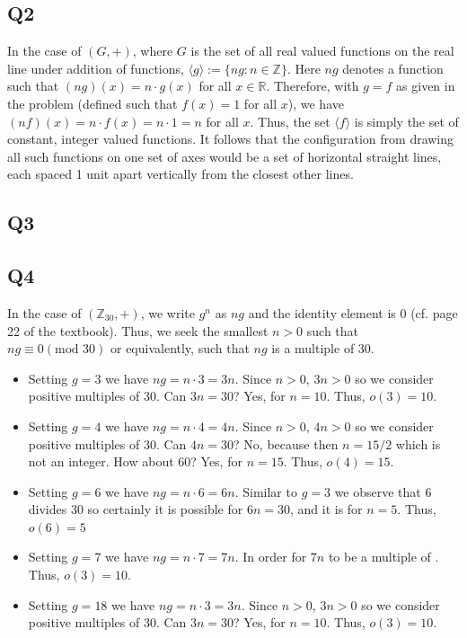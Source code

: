 \documentclass[12pt]{article}
\def\Z{{\mathbb Z}}        %
\def\R{{\mathbb R}}        %
\numberwithin{theorem}{section}
\numberwithin{equation}{section}
\numberwithin{remark}{section}
\numberwithin{definition}{section}
\numberwithin{theorem}{section}
\numberwithin{lemma}{section}
\numberwithin{example}{section}
\begin{document}
\subsection{Q2}

In the case of $(G,+)$, where $G$ is the set of all real valued functions on the real line under addition of functions, $\langle g \rangle:=\{ng:n\in\Z\}$. Here $ng$ denotes a function such that $(ng)(x) = n\cdot g(x)$ for all $x\in\R$.  Therefore, with $g=f$ as given in the problem (defined such that $f(x)=1$ for all $x$), we have $(nf)(x)=n\cdot f(x)=n\cdot1=n$ for all $x$. Thus, the set $\langle f \rangle$ is simply the set of constant, integer valued functions. It follows that the configuration from drawing all such functions on one set of axes would be a set of horizontal straight lines, each spaced 1 unit apart vertically from the closest other lines. 



\subsection{Q3}

\subsection{Q4}

In the case of $(\Z_{30},+)$, we write $g^n$ as $ng$ and the identity element is $0$ (cf. page 22 of the textbook). Thus, we seek the smallest $n>0$ such that $ng\equiv0(\text{mod }{30})$ or equivalently, such that $ng$ is a multiple of 30.
\begin{itemize}
	\item{Setting $g=3$ we have $ng=n\cdot3=3n$. Since $n>0$, $3n>0$ so we consider positive multiples of 30. Can $3n=30$? Yes, for $n=10$. Thus, $o(3)=10$.}
	\item{Setting $g=4$ we have $ng=n\cdot4=4n$. Since $n>0$, $4n>0$ so we consider positive multiples of 30. Can $4n=30$? No, because then $n=15/2$ which is not an integer. How about 60? Yes, for $n=15$. Thus, $o(4)=15$.}
	\item{Setting $g=6$ we have $ng=n\cdot6=6n$. Similar to $g=3$ we observe that 6 divides 30 so certainly it is possible for $6n=30$, and it is for $n=5$. Thus, $o(6)=5$}
	\item{Setting $g=7$ we have $ng=n\cdot7=7n$. In order for $7n$ to be a multiple of . Thus, $o(3)=10$.}
	\item{Setting $g=18$ we have $ng=n\cdot3=3n$. Since $n>0$, $3n>0$ so we consider positive multiples of 30. Can $3n=30$? Yes, for $n=10$. Thus, $o(3)=10$.}
\end{itemize}
\end{document}
